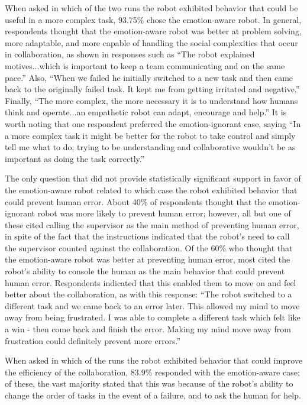 \documentclass[12pt]{report}
\begin{document}
When asked in which of the two runs the robot exhibited
behavior that could be useful in a more complex task, 93.75\% chose the
emotion-aware robot. In general, respondents thought that the emotion-aware
robot was better at problem solving, more adaptable, and more capable of
handling the social complexities that occur in collaboration, as shown in
responses such as ``The robot explained motives...which is important to keep a
team communicating and on the same pace.'' Also, ``When we failed he initially
switched to a new task and then came back to the originally failed task. It kept
me from getting irritated and negative.'' Finally, ``The more complex, the more
necessary it is to understand how humans think and operate...an empathetic robot
can adapt, encourage and help.'' It is worth noting that one respondent
preferred the emotion-ignorant case, saying ``In a more complex task it might be
better for the robot to take control and simply tell me what to do; trying to be
understanding and collaborative wouldn't be as important as doing the task
correctly.''

The only question that did not provide statistically significant support in
favor of the emotion-aware robot related to which case the robot exhibited
behavior that could prevent human error. About 40\% of respondents thought that
the emotion-ignorant robot was more likely to prevent human error; however, all
but one of these cited calling the supervisor as the main method of preventing
human error, in spite of the fact that the instructions indicated that the
robot's need to call the supervisor counted against the collaboration. Of the
60\% who thought that the emotion-aware robot was better at preventing human
error, most cited the robot's ability to console the human as the main behavior
that could prevent human error. Respondents indicated that this enabled them to
move on and feel better about the collaboration, as with this response: ``The
robot switched to a different task and we came back to an error later. This
allowed my mind to move away from being frustrated. I was able to complete a
different task which felt like a win - then come back and finish the error.
Making my mind move away from frustration could definitely prevent more
errors.''

When asked in which of the runs the robot exhibited behavior that could improve
the efficiency of the collaboration, 83.9\% responded with the emotion-aware
case; of these, the vast majority stated that this was because of the robot's
ability to change the order of tasks in the event of a failure, and to ask the
human for help.
\end{document}
